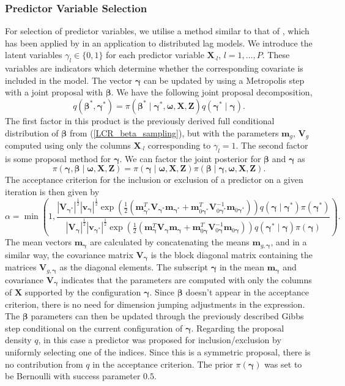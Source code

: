 \documentclass[11pt]{article}
\def\boldm{\mathbf{m}}
\def\boldv{\mathbf{v}}
\def\boldV{\mathbf{V}}
\def\boldX{\mathbf{X}}
\def\boldZ{\mathbf{Z}}
\def\bsbet{\boldsymbol{\beta}}
\def\bsgam{\boldsymbol{\gamma}}
\def\bsom{\boldsymbol{\omega}}
\theoremstyle{plain}
\theoremstyle{definition}
\begin{document}
\subsubsection{Predictor Variable Selection}\label{subsec:pred_sel}
For selection of predictor variables, we utilise a method similar to that of \citet{holmes_bayesian_2006}, which has been applied by \citet{dempsey_bayesian_2025} in an application to distributed lag models. We introduce the latent variables $\gamma_l \in \{0,1\}$ for each predictor variable $\boldX_{\cdot l}$, $l = 1,\dots,P$. These variables are indicators which determine whether the corresponding covariate is included in the model. The vector $\bsgam$ can be updated by using a Metropolis step with a joint proposal with $\bsbet$. We have the following joint proposal decomposition,
\[
q(\bsbet^*, \bsgam^*) = \pi(\bsbet^* \mid \bsgam^*, \bsom, \boldX, \boldZ)q(\bsgam^* \mid \bsgam).
\]
The first factor in this product is the previously derived full conditional distribution of $\bsbet$ from (\ref{LCR_beta_sampling}), but with the parameters $\boldm_g$, $\boldV_g$ computed using only the columns $\boldX_{\cdot l}$ corresponding to $\gamma_{l} = 1$. The second factor is some proposal method for $\bsgam$. We can factor the joint posterior for $\bsbet$ and $\bsgam$ as
\[
\pi(\bsgam, \bsbet \mid  \bsom, \boldX, \boldZ) = \pi(\bsgam \mid \bsom, \boldX, \boldZ)\pi(\bsbet \mid \bsgam, \bsom, \boldX, \boldZ).
\]
The acceptance criterion for the inclusion or exclusion of a predictor on a given iteration is then given by 
\[
   \alpha = \min \left( 1, \frac{|\boldV_{\bsgam^*}|^{\frac{1}{2}}|\boldv_{\bsgam}|^{\frac{1}{2}}\exp\left( \frac{1}{2} \left( \boldm_{\bsgam^*}^T\boldV_{\bsgam^*}\boldm_{\bsgam^*} + \boldm_{0\bsgam^*}^T\boldV_{0\bsgam^*}^{-1}\boldm_{0\bsgam^*} \right) \right)q(\bsgam \mid \bsgam^*)\pi(\bsgam^*)}
   {|\boldV_{\bsgam}|^{\frac{1}{2}}|\boldv_{\bsgam^*}|^{\frac{1}{2}}\exp\left( \frac{1}{2} \left( \boldm_{\bsgam}^T\boldV_{\bsgam}\boldm_{\bsgam} + \boldm_{0\bsgam}^T\boldV_{0\bsgam}^{-1}\boldm_{0\bsgam} \right) \right)q(\bsgam^* \mid \bsgam)\pi(\bsgam)} \right) .
\]
The mean vectors $\boldm_{\bsgam}$ are calculated by concatenating the means $\boldm_{g, \bsgam}$, and in a similar way, the covariance matrix $\boldV_{\bsgam}$ is the block diagonal matrix containing the matrices $\boldV_{g, \bsgam}$ as the diagonal elements. The subscript $\bsgam$ in the mean $\boldm_{\bsgam}$ and covariance $\boldV_{\bsgam}$ indicates that the parameters are computed with only the columns of $\boldX$ supported by the configuration $\bsgam$. Since $\bsbet$ doesn't appear in the acceptance criterion, there is no need for dimension jumping adjustments in the expression. The $\bsbet$ parameters can then be updated through the previously described Gibbs step conditional on the current configuration of $\bsgam$. Regarding the proposal density $q$, in this case a predictor was proposed for inclusion/exclusion by uniformly selecting one of the indices. Since this is a symmetric proposal, there is no contribution from $q$ in the acceptance criterion. The prior $\pi(\bsgam)$ was set to be Bernoulli with success parameter $0.5$. 
\end{document}
